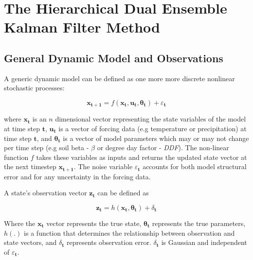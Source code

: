 \chapter{The Hierarchical Dual Ensemble Kalman Filter Method}


\section{General Dynamic Model and Observations}


A generic dynamic model can be defined as one more more discrete nonlinear stochastic processes\cite{Chen2008}:

\begin{equation}\label{eq:gen_stoc}
\mathbf{x_{t+1}} = f(\mathbf{x_{t}}, \mathbf{u_{t}}, \mathbf{\theta_{t}}) + \varepsilon_{\mathbf{t}}
\end{equation}

where $\mathbf{x_{t}}$ is an $n$ dimensional vector representing the state variables of the model at time step $\mathbf{t}$, $\mathbf{u_{t}}$ is a vector of forcing data (e.g temperature or precipitation) at time step $\mathbf{t}$, and $\mathbf{\theta_{t}}$ is a vector of model parameters which may or may not change per time step (e.g soil beta - $\beta$ or degree day factor -  \textit{DDF}). The non-linear function $f$ takes these variables as inputs and returns the updated state vector at the next timestep $\mathbf{x_{t+1}}$. The noise variable $\varepsilon_{\mathbf{t}}$ accounts for both model structural error and for any uncertainty in the forcing data.

A state's observation vector $\mathbf{z_{t}}$ can be defined as

\begin{equation}\label{eq:gen_obs}
\mathbf{z_{t}} = h(\mathbf{x_{t}}, \mathbf{\theta_{t}}) + \delta_{\mathbf{t}}
\end{equation}

Where the $\mathbf{x_{t}}$ vector represents the true state, $\mathbf{\theta_{t}}$ represents the true parameters, $h(.)$ is a function that determines the relationship between observation and state vectors, and $\delta_{\mathbf{t}}$ represents observation error. $\delta_{\mathbf{t}}$ is Gaussian and independent of $\varepsilon_{\mathbf{t}}$.

